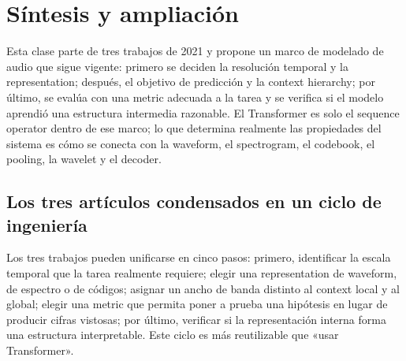 \section{Síntesis y ampliación}

Esta clase parte de tres trabajos de 2021 y propone un marco de modelado de audio que sigue vigente: primero se deciden la resolución temporal y la representation; después, el objetivo de predicción y la context hierarchy; por último, se evalúa con una metric adecuada a la tarea y se verifica si el modelo aprendió una estructura intermedia razonable. El Transformer es solo el sequence operator dentro de ese marco; lo que determina realmente las propiedades del sistema es cómo se conecta con la waveform, el spectrogram, el codebook, el pooling, la wavelet y el decoder.



\subsection{Los tres artículos condensados en un ciclo de ingeniería}

Los tres trabajos pueden unificarse en cinco pasos: primero, identificar la escala temporal que la tarea realmente requiere; elegir una representation de waveform, de espectro o de códigos; asignar un ancho de banda distinto al context local y al global; elegir una metric que permita poner a prueba una hipótesis en lugar de producir cifras vistosas; por último, verificar si la representación interna forma una estructura interpretable. Este ciclo es más reutilizable que «usar Transformer».

